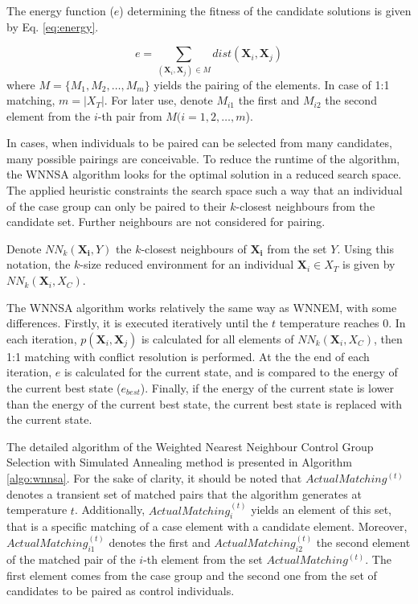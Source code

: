 		The energy function ($e$) determining the fitness of the candidate solutions is given by Eq. \ref{eq:energy}. 
								
		\begin{equation}
			e=\sum_{(\textbf{X}_i, \textbf{X}_j) \in M} dist(\textbf{X}_i, \textbf{X}_j)
			\label{eq:energy}
		\end{equation}
		where $M=\{M_1, M_2, \dots, M_m\}$ yields the pairing of the elements. In case of 1:1 matching, $m=|X_T|$. For later use, denote $M_{i1}$ the first and $M_{i2}$ the second element from the $i$-th pair from $M (i=1, 2, \dots, m$).   
								
		In cases, when individuals to be paired can be selected from many candidates, many possible pairings are conceivable. To reduce the runtime of the algorithm, the WNNSA algorithm looks for the optimal solution in a reduced search space. The applied heuristic constraints the search space such a way that an individual of the case group can only be paired to their $k$-closest neighbours from the candidate set. Further neighbours are not considered for pairing.
								
		Denote $NN_k(\mathbf{X_i},Y)$ the $k$-closest neighbours of $\mathbf{X_i}$ from the set $Y$. Using this notation, the $k$-size reduced environment for an individual $\mathbf{X}_i \in X_T$ is given by $NN_k (\mathbf{X}_i,X_C)$.  
		
		The WNNSA algorithm works relatively the same way as WNNEM, with some differences. Firstly, it is executed iteratively until the $t$ temperature reaches $0$. In each iteration, $p(\textbf{X}_i,\textbf{X}_j)$ is calculated for all elements of $NN_k(\textbf{X}_i, X_C)$, then 1:1 matching with conflict resolution is performed. At the the end of each iteration, $e$ is calculated for the current state, and is compared to the energy of the current best state ($e_{best}$). Finally, if the energy of the current state is lower than the energy of the current best state, the current best state is replaced with the current state.
		    
		The detailed algorithm of the Weighted Nearest Neighbour Control Group Selection with Simulated Annealing method is presented in Algorithm \ref{algo:wnnsa}. For the sake of clarity, it should be noted that $ActualMatching^{(t)}$ denotes a transient set of matched pairs that the algorithm generates at temperature $t$. Additionally, $ActualMatching_i^{(t)}$ yields an element of this set, that is a specific matching of a case element with a candidate element. Moreover, $ActualMatching_{i1}^{(t)}$ denotes the first and $ActualMatching_{i2}^{(t)}$ the second element of the matched pair of the $i$-th element from the set $ActualMatching^{(t)}$. The first element comes from the case group and the second one from the set of candidates to be paired as control individuals. 
								
